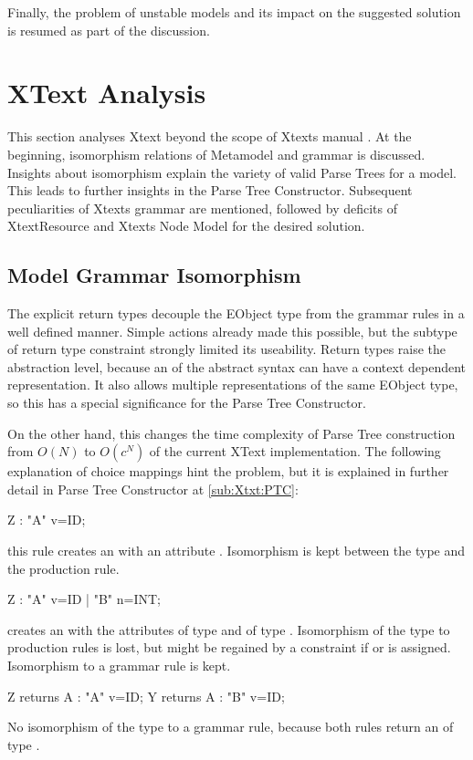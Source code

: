 Finally, the problem of unstable models and its impact on the suggested solution is resumed as part of the discussion.


\section{XText Analysis}
This section analyses Xtext beyond the scope of Xtexts manual \cite{XTextMan}. At the beginning, isomorphism relations of Metamodel and grammar is discussed. Insights about isomorphism explain the variety of valid Parse Trees for a model. This leads to further insights in the Parse Tree Constructor. Subsequent peculiarities of Xtexts grammar are mentioned, followed by deficits of XtextResource and Xtexts Node Model for the desired solution.

\subsection{Model Grammar Isomorphism}
The explicit return types decouple the EObject type from the grammar rules in a well defined manner. Simple actions already made this possible, but the subtype of return type constraint strongly limited its useability. Return types raise the abstraction level, because an  of the abstract syntax can have a context dependent representation. It also allows multiple representations of the same EObject type, so this has a special significance for the Parse Tree Constructor.

On the other hand, this changes the time complexity of Parse Tree construction from $O(N)$ to $O(c^N)$ of the current XText implementation. The following explanation of choice mappings hint the problem, but it is explained in further detail in Parse Tree Constructor at \ref{sub:Xtxt:PTC}: 
\begin{xtxt}
Z 	:  "A" v=ID;
\end{xtxt}
this rule creates an   with an  attribute . Isomorphism is kept between the type  and the production rule.
\begin{xtxt}
Z 	:  "A" v=ID  
	|  "B" n=INT;
	\end{xtxt}
creates an   with the attributes  of type  and  of type .  Isomorphism of the type to production rules is lost, but might be regained by a constraint if  or  is assigned. Isomorphism to a grammar rule is kept.
\begin{xtxt}
Z returns A : "A" v=ID;
Y returns A : "B" v=ID;
\end{xtxt}
No isomorphism of the type  to a grammar rule, because both rules return an  of type .

